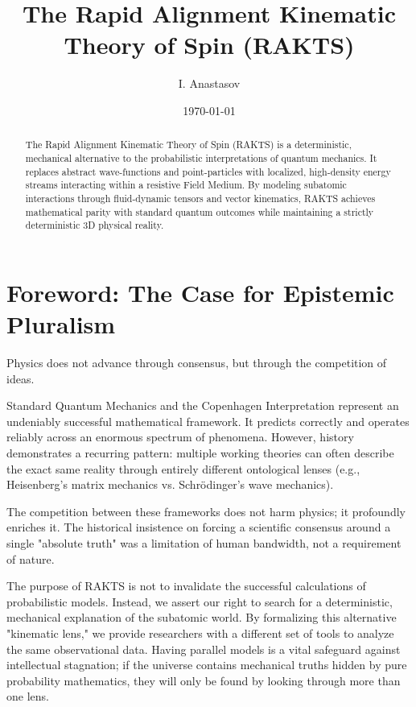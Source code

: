 \documentclass[reprint,amsmath,amssymb,aps,prd,twocolumn]{revtex4-2}
\begin{document}
\title{The Rapid Alignment Kinematic Theory of Spin (RAKTS)}
\author{I. Anastasov}
\date{\today}

\begin{abstract}
The Rapid Alignment Kinematic Theory of Spin (RAKTS) is a deterministic, mechanical alternative to the probabilistic interpretations of quantum mechanics. It replaces abstract wave-functions and point-particles with localized, high-density energy streams interacting within a resistive Field Medium. By modeling subatomic interactions through fluid-dynamic tensors and vector kinematics, RAKTS achieves mathematical parity with standard quantum outcomes while maintaining a strictly deterministic 3D physical reality.
\end{abstract}

\maketitle

\section{Foreword: The Case for Epistemic Pluralism}
Physics does not advance through consensus, but through the competition of ideas.

Standard Quantum Mechanics and the Copenhagen Interpretation represent an undeniably successful mathematical framework. It predicts correctly and operates reliably across an enormous spectrum of phenomena. However, history demonstrates a recurring pattern: multiple working theories can often describe the exact same reality through entirely different ontological lenses (e.g., Heisenberg’s matrix mechanics vs. Schrödinger’s wave mechanics). 

The competition between these frameworks does not harm physics; it profoundly enriches it. The historical insistence on forcing a scientific consensus around a single "absolute truth" was a limitation of human bandwidth, not a requirement of nature.

The purpose of RAKTS is not to invalidate the successful calculations of probabilistic models. Instead, we assert our right to search for a deterministic, mechanical explanation of the subatomic world. By formalizing this alternative "kinematic lens," we provide researchers with a different set of tools to analyze the same observational data. Having parallel models is a vital safeguard against intellectual stagnation; if the universe contains mechanical truths hidden by pure probability mathematics, they will only be found by looking through more than one lens.
\end{document}

